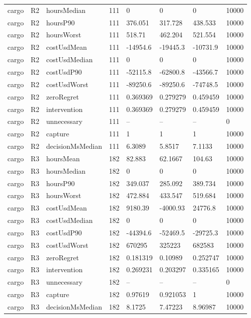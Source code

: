 \begin{tabular}{llllllll}
cargo & R2 & hoursMedian & 111 & 0 & 0 & 0 & 10000 \\
cargo & R2 & hoursP90 & 111 & 376.051 & 317.728 & 438.533 & 10000 \\
cargo & R2 & hoursWorst & 111 & 518.71 & 462.204 & 521.554 & 10000 \\
cargo & R2 & costUsdMean & 111 & -14954.6 & -19445.3 & -10731.9 & 10000 \\
cargo & R2 & costUsdMedian & 111 & 0 & 0 & 0 & 10000 \\
cargo & R2 & costUsdP90 & 111 & -52115.8 & -62800.8 & -43566.7 & 10000 \\
cargo & R2 & costUsdWorst & 111 & -89250.6 & -89250.6 & -74748.5 & 10000 \\
cargo & R2 & zeroRegret & 111 & 0.369369 & 0.279279 & 0.459459 & 10000 \\
cargo & R2 & intervention & 111 & 0.369369 & 0.279279 & 0.459459 & 10000 \\
cargo & R2 & unnecessary & 111 & -- & -- & -- & 0 \\
cargo & R2 & capture & 111 & 1 & 1 & 1 & 10000 \\
cargo & R2 & decisionMsMedian & 111 & 6.3089 & 5.8517 & 7.1133 & 10000 \\
cargo & R3 & hoursMean & 182 & 82.883 & 62.1667 & 104.63 & 10000 \\
cargo & R3 & hoursMedian & 182 & 0 & 0 & 0 & 10000 \\
cargo & R3 & hoursP90 & 182 & 349.037 & 285.092 & 389.734 & 10000 \\
cargo & R3 & hoursWorst & 182 & 472.884 & 433.547 & 519.684 & 10000 \\
cargo & R3 & costUsdMean & 182 & 9180.39 & -4000.93 & 24776.8 & 10000 \\
cargo & R3 & costUsdMedian & 182 & 0 & 0 & 0 & 10000 \\
cargo & R3 & costUsdP90 & 182 & -44394.6 & -52469.5 & -29725.3 & 10000 \\
cargo & R3 & costUsdWorst & 182 & 670295 & 325223 & 682583 & 10000 \\
cargo & R3 & zeroRegret & 182 & 0.181319 & 0.10989 & 0.252747 & 10000 \\
cargo & R3 & intervention & 182 & 0.269231 & 0.203297 & 0.335165 & 10000 \\
cargo & R3 & unnecessary & 182 & -- & -- & -- & 0 \\
cargo & R3 & capture & 182 & 0.97619 & 0.921053 & 1 & 10000 \\
cargo & R3 & decisionMsMedian & 182 & 8.1725 & 7.47223 & 8.96987 & 10000 \\

\end{tabular}
